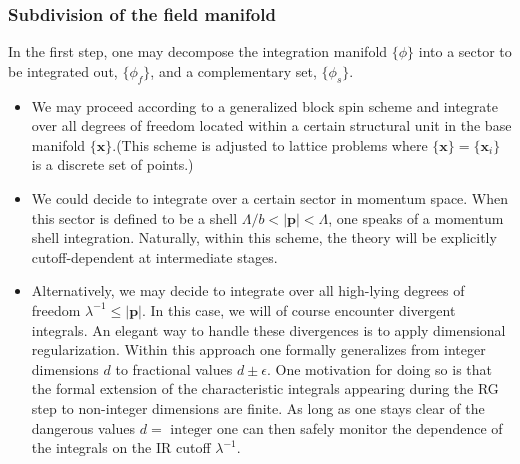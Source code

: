\documentclass[cyan]{elegantnote}
\begin{document}
\subsubsection{Subdivision of the field manifold}
In the first step, one may decompose the integration manifold $\{\phi\}$ into a sector to be integrated out, $\{\phi_f\}$, and a complementary set, $\{\phi_s\}$.
\begin{itemize}
\item We may proceed according to a generalized block spin scheme and integrate over all degrees of freedom located within a certain structural unit in the base manifold $\{\bm{x}\}$.(This scheme is adjusted to lattice problems where $\{\bm{x}\} = \{\bm{x}_i\}$ is a discrete set of points.)
\item We could decide to integrate over a certain sector in momentum space. When this sector is defined to be a shell $\Lambda /b < |\bm{p}| < \Lambda$, one speaks of a momentum shell integration. Naturally, within this scheme, the theory will be explicitly cutoff-dependent at intermediate stages.
\item Alternatively, we may decide to integrate over all high-lying degrees of freedom $\lambda^{-1} \leq |\bm{p}|$.
In this case, we will of course encounter divergent integrals. An elegant way to handle these divergences is to apply dimensional regularization. Within this approach one formally generalizes from integer dimensions $d$ to fractional values $d \pm \epsilon$. 
One motivation for doing so is that the formal extension of the characteristic integrals appearing during the RG step to non-integer dimensions are finite. As long as one stays clear of the dangerous values $d = \mbox{ integer}$ one can then safely monitor the dependence of the integrals on the IR cutoff $\lambda^{-1}$.
\end{itemize}
\end{document}
